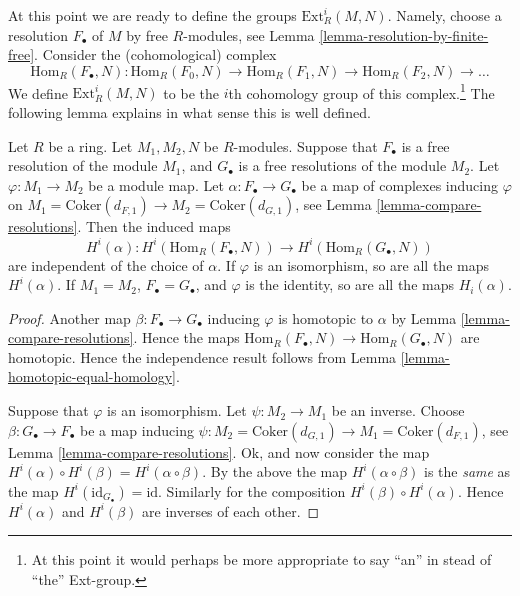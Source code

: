 \noindent
At this point we are ready to define the groups
$\text{Ext}^i_R(M, N)$. Namely, choose a resolution
$F_{\bullet}$ of $M$ by free $R$-modules, see Lemma
\ref{lemma-resolution-by-finite-free}. Consider
the (cohomological) complex 
$$
\text{Hom}_R(F_\bullet, N) :
\text{Hom}_R(F_0, N) \to 
\text{Hom}_R(F_1, N) \to 
\text{Hom}_R(F_2, N) \to \ldots
$$
We define $\text{Ext}^i_R(M, N)$ to be the $i$th
cohomology group of this complex.\footnote{At this point
it would perhaps be more appropriate to say ``an'' in stead
of ``the'' Ext-group.} The following lemma explains
in what sense this is well defined.

\begin{lemma}
\label{lemma-ext-welldefined}
Let $R$ be a ring. Let $M_1, M_2, N$ be $R$-modules.
Suppose that $F_{\bullet}$ is a free resolution of the module $M_1$,
and $G_{\bullet}$ is a free resolutions of the module $M_2$.
Let $\varphi : M_1 \to M_2$ be a module map.
Let $\alpha : F_{\bullet} \to G_{\bullet}$ be
a map of complexes inducing $\varphi$ on
$M_1 = \text{Coker}(d_{F, 1}) \to M_2 = \text{Coker}(d_{G, 1})$,
see Lemma \ref{lemma-compare-resolutions}.
Then the induced maps
$$
H^i(\alpha) :
H^i(\text{Hom}_R(F_{\bullet}, N))
\longrightarrow
H^i(\text{Hom}_R(G_{\bullet}, N))
$$
are independent of the choice of $\alpha$.
If $\varphi$ is an isomorphism, so are all the maps
$H^i(\alpha)$. If $M_1 = M_2$, $F_\bullet = G_\bullet$, and
$\varphi$ is the identity, so are all the maps $H_i(\alpha)$.
\end{lemma}

\begin{proof}
Another map $\beta : F_{\bullet} \to G_{\bullet}$
inducing $\varphi$ is homotopic to $\alpha$ by
Lemma \ref{lemma-compare-resolutions}. Hence the
maps $\text{Hom}_R(F_\bullet, N) \to
\text{Hom}_R(G_\bullet, N)$ are homotopic.
Hence the independence result follows from
Lemma \ref{lemma-homotopic-equal-homology}.

\medskip\noindent
Suppose that $\varphi$ is an isomorphism.
Let $\psi : M_2 \to M_1$ be an inverse.
Choose $\beta : G_{\bullet} \to F_{\bullet}$
be a map inducing $\psi :
M_2 = \text{Coker}(d_{G, 1}) \to M_1 = \text{Coker}(d_{F, 1})$,
see Lemma \ref{lemma-compare-resolutions}. 
Ok, and now consider the map
$H^i(\alpha) \circ H^i(\beta) =
H^i(\alpha \circ \beta)$. By the above the
map $H^i(\alpha \circ \beta)$ is the {\it same}
as the map $H^i(\text{id}_{G_{\bullet}}) = \text{id}$.
Similarly for the composition $H^i(\beta) \circ H^i(\alpha)$.
Hence $H^i(\alpha)$ and $H^i(\beta)$ are inverses of each other.
\end{proof}


